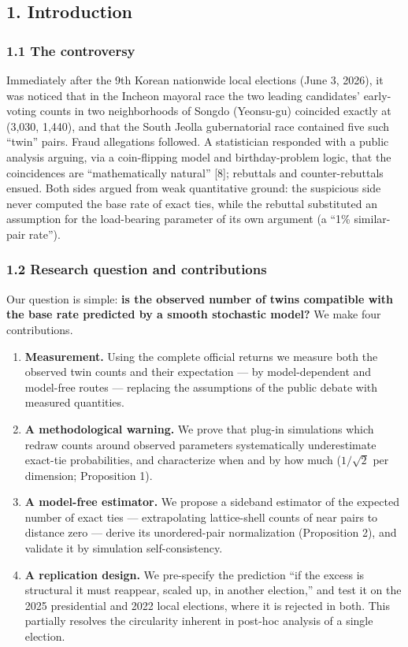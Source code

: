\documentclass[
  11pt,
]{article}
\providecommand{\tightlist}{%
  \setlength{\itemsep}{0pt}\setlength{\parskip}{0pt}}
\begin{document}
\subsection{1. Introduction}\label{introduction}

\subsubsection{1.1 The controversy}\label{the-controversy}

Immediately after the 9th Korean nationwide local elections (June 3,
2026), it was noticed that in the Incheon mayoral race the two leading
candidates' early-voting counts in two neighborhoods of Songdo
(Yeonsu-gu) coincided exactly at (3,030, 1,440), and that the South
Jeolla gubernatorial race contained five such ``twin'' pairs. Fraud
allegations followed. A statistician responded with a public analysis
arguing, via a coin-flipping model and birthday-problem logic, that the
coincidences are ``mathematically natural'' {[}8{]}; rebuttals and
counter-rebuttals ensued. Both sides argued from weak quantitative
ground: the suspicious side never computed the base rate of exact ties,
while the rebuttal substituted an assumption for the load-bearing
parameter of its own argument (a ``1\% similar-pair rate'').

\subsubsection{1.2 Research question and
contributions}\label{research-question-and-contributions}

Our question is simple: \textbf{is the observed number of twins
compatible with the base rate predicted by a smooth stochastic model?}
We make four contributions.

\begin{enumerate}
\def\labelenumi{\arabic{enumi}.}
\tightlist
\item
  \textbf{Measurement.} Using the complete official returns we measure
  both the observed twin counts and their expectation --- by
  model-dependent and model-free routes --- replacing the assumptions of
  the public debate with measured quantities.
\item
  \textbf{A methodological warning.} We prove that plug-in simulations
  which redraw counts around observed parameters systematically
  underestimate exact-tie probabilities, and characterize when and by
  how much (\(1/\sqrt{2}\) per dimension; Proposition 1).
\item
  \textbf{A model-free estimator.} We propose a sideband estimator of
  the expected number of exact ties --- extrapolating lattice-shell
  counts of near pairs to distance zero --- derive its unordered-pair
  normalization (Proposition 2), and validate it by simulation
  self-consistency.
\item
  \textbf{A replication design.} We pre-specify the prediction ``if the
  excess is structural it must reappear, scaled up, in another
  election,'' and test it on the 2025 presidential and 2022 local
  elections, where it is rejected in both. This partially resolves the
  circularity inherent in post-hoc analysis of a single election.
\end{enumerate}
\end{document}
